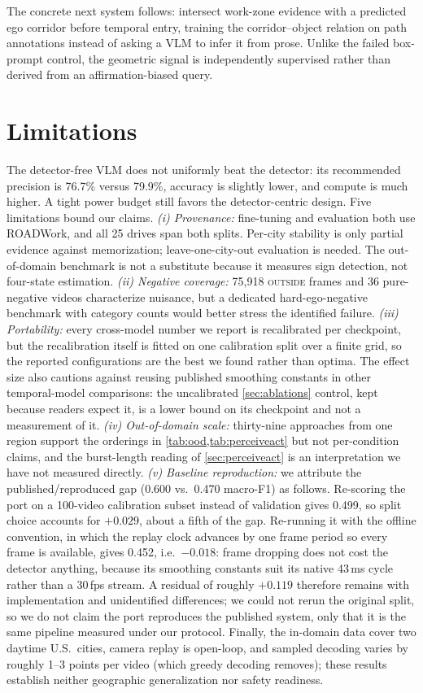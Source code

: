 \documentclass[journal]{IEEEtran}
\begin{document}
The concrete next system follows: intersect work-zone evidence with a predicted ego corridor before temporal entry, training the corridor--object relation on path annotations instead of asking a VLM to infer it from prose.  Unlike the failed box-prompt control, the geometric signal is independently supervised rather than derived from an affirmation-biased query.

\section{Limitations}
\label{sec:limitations}

The detector-free VLM does not uniformly beat the detector: its recommended precision is 76.7\% versus 79.9\%, accuracy is slightly lower, and compute is much higher.  A tight power budget still favors the detector-centric design.  Five limitations bound our claims.  \emph{(i) Provenance:} fine-tuning and evaluation both use ROADWork, and all 25 drives span both splits.  Per-city stability is only partial evidence against memorization; leave-one-city-out evaluation is needed.  The out-of-domain benchmark is not a substitute because it measures sign detection, not four-state estimation.  \emph{(ii) Negative coverage:} 75{,}918 \textsc{outside} frames and 36 pure-negative videos characterize nuisance, but a dedicated hard-ego-negative benchmark with category counts would better stress the identified failure.  \emph{(iii) Portability:} every cross-model number we report is recalibrated per checkpoint, but the recalibration itself is fitted on one calibration split over a finite grid, so the reported configurations are the best we found rather than optima.  The effect size also cautions against reusing published smoothing constants in other temporal-model comparisons: the uncalibrated \cref{sec:ablations} control, kept because readers expect it, is a lower bound on its checkpoint and not a measurement of it.  \emph{(iv) Out-of-domain scale:} thirty-nine approaches from one region support the orderings in \cref{tab:ood,tab:perceiveact} but not per-condition claims, and the burst-length reading of \cref{sec:perceiveact} is an interpretation we have not measured directly.  \emph{(v) Baseline reproduction:} we attribute the published/reproduced gap (0.600 vs.\ 0.470 macro-F1) as follows.  Re-scoring the port on a 100-video calibration subset instead of validation gives 0.499, so split choice accounts for $+0.029$, about a fifth of the gap.  Re-running it with the offline convention, in which the replay clock advances by one frame period so every frame is available, gives 0.452, i.e.\ $-0.018$: frame dropping does not cost the detector anything, because its smoothing constants suit its native 43\,ms cycle rather than a 30\,fps stream.  A residual of roughly $+0.119$ therefore remains with implementation and unidentified differences; we could not rerun the original split, so we do not claim the port reproduces the published system, only that it is the same pipeline measured under our protocol.  Finally, the in-domain data cover two daytime U.S.\ cities, camera replay is open-loop, and sampled decoding varies by roughly 1--3 points per video (which greedy decoding removes); these results establish neither geographic generalization nor safety readiness.
\end{document}
